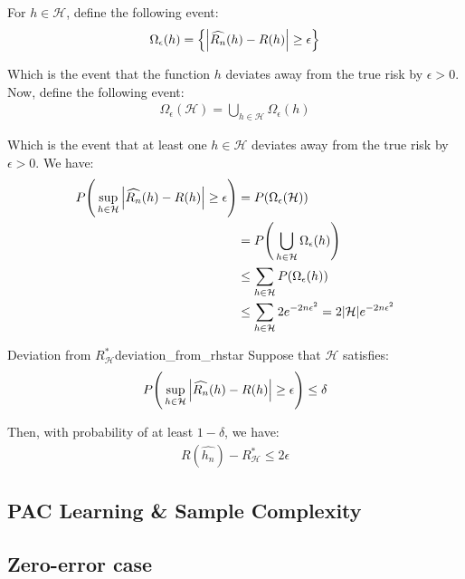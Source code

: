 \begin{proof*}
    For $h\in\mathcal{H}$, define the following event:
    \begin{align*}
        \Omega_\epsilon(h) = \Big\{ 
            \Big| 
                \widehat{R_n}(h) - R(h)
             \Big| \ge \epsilon
         \Big\}
    \end{align*}

    \noindent Which is the event that the function $h$ deviates away from the true risk by $\epsilon>0$. Now, define the following event:
    \begin{align*}
        \Omega_\epsilon(\mathcal{H}) = \bigcup_{h\in\mathcal{H}} \Omega_\epsilon (h)
    \end{align*}

    \noindent Which is the event that at least one $h\in\mathcal{H}$ deviates away from the true risk by $\epsilon>0$. We have:
    \begin{align*}
        P\Bigg( 
            \sup_{h\in\mathcal{H}}\Big| \widehat{R_n}(h) - R(h) \Big| \ge \epsilon
         \Bigg) &= P(\Omega_\epsilon(\mathcal{H})) \\
        &= P\Bigg( 
            \bigcup_{h\in\mathcal{H}} \Omega_\epsilon (h)
         \Bigg) \\
        &\le \sum_{h\in\mathcal{H}} P(\Omega_\epsilon(h)) \\
        &\le \sum_{h\in\mathcal{H}} 2e^{-2n\epsilon^2} = 2|\mathcal{H}|e^{-2n\epsilon^2}
    \end{align*}
\end{proof*}

\begin{proposition}{Deviation from $R_\mathcal{H}^*$}{deviation_from_rhstar}
    Suppose that $\mathcal{H}$ satisfies:
    \begin{align*}
        P\Bigg( 
            \sup_{h\in\mathcal{H}}\Big| \widehat{R_n}(h) - R(h) \Big| \ge \epsilon
         \Bigg) \le \delta
    \end{align*}

    \noindent Then, with probability of at least $1-\delta$, we have:
    \begin{align*}
        R(\widehat{h_n}) - R_\mathcal{H}^* \le 2\epsilon
    \end{align*}
\end{proposition}

\subsection{PAC Learning \& Sample Complexity}

\subsection{Zero-error case}